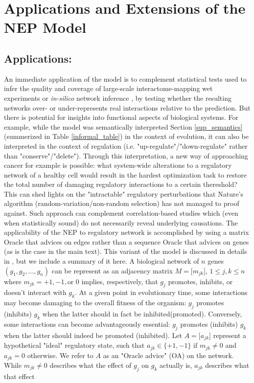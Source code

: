 

\section{Applications and Extensions of the NEP Model}\label{sup_extensions}
		\subsection{Applications:}
         An immediate application of the model is to complement statistical tests used to infer the quality and coverage of large-scale interactome-mapping wet experiments  \cite{rolland_proteome-scale_2014} or \textit{in-silico} network inference  \cite{mitra_integrative_2013}, by testing whether the resulting networks over- or under-represents real interactions relative to the prediction. But there is potential for insights into functional aspects of biological systems. For example, while the model was semantically interpreted Section \ref{sup_semantics} (summerized in Table \ref{informal_table}) in the context of evolution, it can also be interpreted in the context of regulation (i.e. "up-regulate"/"down-regulate" rather than "conserve"/"delete"). Through this interpretation, a new way of approaching cancer for example is possible: what system-wide alterations to a regulatory network of a healthy cell would result in the hardest optimization task to restore the total number of damaging regulatory interactions to a certain thereshold? This can shed lights on the "intractable" regulatory perturbations that Nature's algorithm (random-variation/non-random selection) has not managed to proof against. Such approach can complement correlation-based studies  \cite{colquhoun_investigation_2014} which (even when statistically sound) do not necessarily reveal underlying causations.  The applicability of the NEP to regulatory network is accomplished by using a matrix Oracle that advices on edges rather than a sequence Oracle that advices on genes (as is the case in the main text). This variant of the model is discussed in details in  \cite{atiia_computational_2017}, but we include a summary of it here. A biological network of $n$ genes $(g_1, g_2,\dots, g_n)$ can be represent as an adjacency matrix $M=\big [m_{jk}\big ]$, $1\leq j,k\leq n$ where $m_{jk} = +1, -1,\text{or } 0$ implies, respectively, that $g_j$ promotes, inhibits, or doesn't interact with $g_k$. At a given point in evolutionary time, some interactions may become damaging to the overall fitness of the organism: $g_j$ promotes (inhibits) $g_k$ when the latter should in fact be inhibited(promoted). Conversely, some interactions can become advantageously essential: $g_j$ promotes (inhibits) $g_k$ when the latter should indeed be promoted (inhibited). Let $A=\big [a_{jk}\big ]$ represent a hypothetical "ideal" regulatory state, such that $a_{jk}\in\{+1,-1\}$ if $m_{jk}\neq 0$ and $a_{jk}=0$ otherwise. We refer to $A$ as an "Oracle advice" (OA) on the network. While $m_{jk}\neq 0$ describes what the effect of $g_j$ on $g_k$ actually is, $a_{jk}$ describes what that effect 